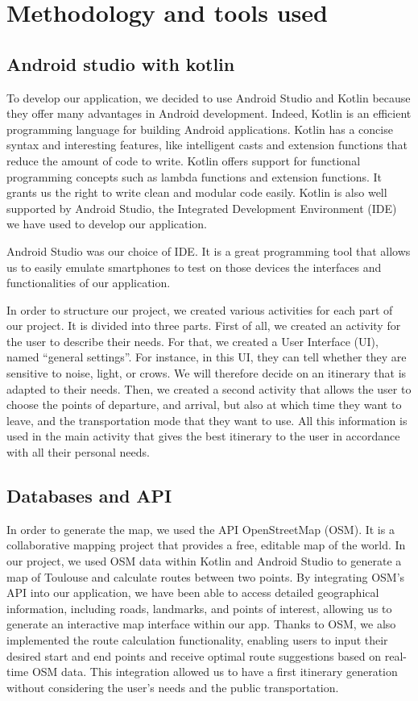 \section{Methodology and tools used}


\subsection{Android studio with kotlin}


To develop our application, we decided to use Android Studio and Kotlin because they offer many advantages in Android development. Indeed, Kotlin is an efficient programming language for building Android applications. Kotlin has a concise syntax and interesting features, like intelligent casts and extension functions that reduce the amount of code to write. Kotlin offers support for functional programming concepts such as lambda functions and extension functions. It grants us the right to write clean and modular code easily. Kotlin is also well supported by Android Studio, the Integrated Development Environment (IDE) we have used to develop our application.


Android Studio was our choice of IDE. It is a great programming tool that allows us to easily emulate smartphones to test on those devices the interfaces and functionalities of our application.


In order to structure our project, we created various activities for each part of our project. It is divided into three parts. First of all, we created an activity for the user to describe their needs. For that, we created a User Interface (UI), named “general settings”. For instance, in this UI, they can tell whether they are sensitive to noise, light, or crows. We will therefore decide on an itinerary that is adapted to their needs. Then, we created a second activity that allows the user to choose the points of departure, and arrival, but also at which time they want to leave, and the transportation mode that they want to use. All this information is used in the main activity that gives the best itinerary to the user in accordance with all their personal needs.


\subsection{Databases and API}


In order to generate the map, we used the API OpenStreetMap (OSM). It is a collaborative mapping project that provides a free, editable map of the world. In our project, we used OSM data within Kotlin and Android Studio to generate a map of Toulouse and calculate routes between two points. By integrating OSM's API into our application, we have been able to access detailed geographical information, including roads, landmarks, and points of interest, allowing us to generate an interactive map interface within our app. Thanks to OSM, we also implemented the route calculation functionality, enabling users to input their desired start and end points and receive optimal route suggestions based on real-time OSM data. This integration allowed us to have a first itinerary generation without considering the user’s needs and the public transportation.


